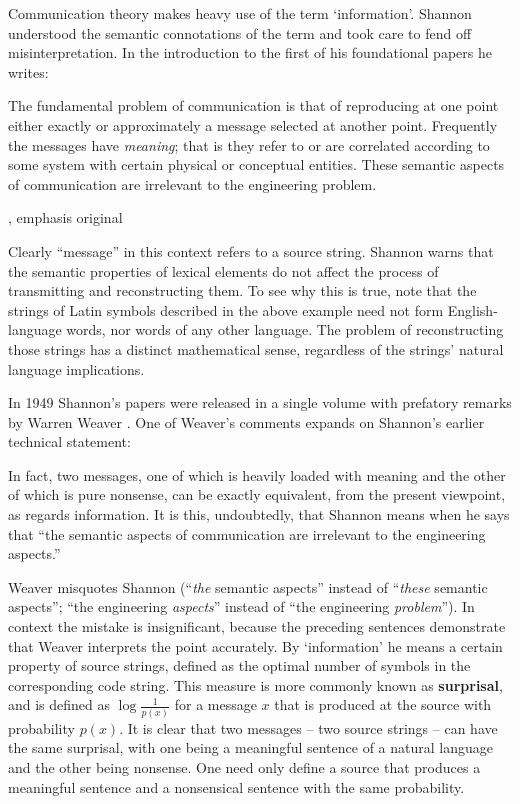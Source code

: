 \documentclass[12pt]{article}
\begin{document}
Communication theory makes heavy use of the term `information'.
Shannon understood the semantic connotations of the term and took care to fend off misinterpretation.
In the introduction to the first of his foundational papers he writes:

\begin{myquote}
The fundamental problem of communication is that of reproducing at one point either exactly or approximately a message selected at another point. Frequently the messages have \emph{meaning}; that is they refer to or are correlated according to some system with certain physical or conceptual entities. These semantic aspects of communication are irrelevant to the engineering problem.
\par\hspace*{\fill}\citet[379]{shannon1948mathematicalc}, emphasis original
\end{myquote}

\noindent Clearly ``message'' in this context refers to a source string.
Shannon warns that the semantic properties of lexical elements do not affect the process of transmitting and reconstructing them.
To see why this is true, note that the strings of Latin symbols described in the above example need not form English-language words, nor words of any other language.
The problem of reconstructing those strings has a distinct mathematical sense, regardless of the strings' natural language implications.

In 1949 Shannon's papers were released in a single volume with prefatory remarks by Warren Weaver \citep{shannon1949mathematical}.
One of Weaver's comments expands on Shannon's earlier technical statement:

\begin{myquote}
In fact, two messages, one of which is heavily loaded with meaning and the other of which is pure nonsense, can be exactly equivalent, from the present viewpoint, as regards information. It is this, undoubtedly, that Shannon means when he says that ``the semantic aspects of communication are irrelevant to the engineering aspects.''
\par\hspace*{\fill}\citet[8]{shannon1949mathematical}
\end{myquote}

\noindent Weaver misquotes Shannon (``\emph{the} semantic aspects'' instead of ``\emph{these} semantic aspects''; ``the engineering \textit{aspects}'' instead of ``the engineering \textit{problem}'').
In context the mistake is insignificant, because the preceding sentences demonstrate that Weaver interprets the point accurately.
By `information' he means a certain property of source strings, defined as the optimal number of symbols in the corresponding code string.
This measure is more commonly known as \textbf{surprisal}, and is defined as $\log{\frac{1}{p(x)}}$ for a message $x$ that is produced at the source with probability $p(x)$.
It is clear that two messages -- two source strings -- can have the same surprisal, with one being a meaningful sentence of a natural language and the other being nonsense.
One need only define a source that produces a meaningful sentence and a nonsensical sentence with the same probability.
\end{document}
